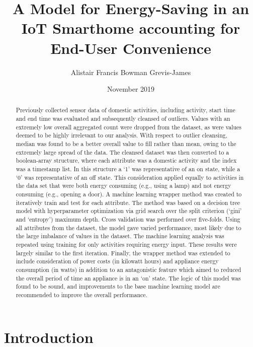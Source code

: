 \documentclass[11pt,]{article}
\title{A Model for Energy-Saving in an IoT Smarthome accounting for End-User
Convenience}
\author{Alistair Francis Bowman Grevis-James}
\date{November 2019}
\begin{document}
\maketitle
\begin{abstract}
\par

Previously collected sensor data of domestic activities, including
activity, start time and end time was evaluated and subsequently
cleansed of outliers. Values with an extremely low overall aggregated
count were dropped from the dataset, as were values deemed to be highly
irrelevant to our analysis. With respect to outlier cleansing, median
was found to be a better overall value to fill rather than mean, owing
to the extremely large spread of the data. The cleansed dataset was then
converted to a boolean-array structure, where each attribute was a
domestic activity and the index was a timestamp list. In this structure
a `1' was representative of an on state, while a `0' was representative
of an off state. This consideration applied equally to activities in the
data set that were both energy consuming (e.g., using a lamp) and not
energy consuming (e.g., opening a door). A machine learning wrapper
method was created to iteratively train and test for each attribute. The
method was based on a decision tree model with hyperparameter
optimization via grid search over the split criterion (`gini' and
`entropy') maximum depth. Cross validation was performed over
five-folds. Using all attributes from the dataset, the model gave varied
performance, most likely due to the large imbalance of values in the
dataset. The machine learning analysis was repeated using training for
only activities requiring energy input. These results were largely
similar to the first iteration. Finally, the wrapper method was extended
to include consideration of power costs (in kilowatt hours) and
appliance energy consumption (in watts) in addition to an antagonistic
feature which aimed to reduced the overall period of time an appliance
is in an `on' state. The logic of this model was found to be sound, and
improvements to the base machine learning model are recommended to
improve the overall performance. \pagebreak
\end{abstract}

{
\setcounter{tocdepth}{3}
\tableofcontents
}
\pagebreak

\hypertarget{introduction}{%
\section{Introduction}\label{introduction}}
\end{document}

